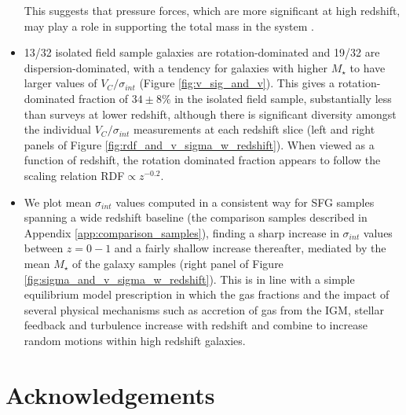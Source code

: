 \documentclass[fleqn,usenatbib]{mnras}
\begin{document}
\begin{itemize}
    This suggests that pressure forces, which are more significant at high redshift, may play a role in supporting the total mass in the system \citep[e.g.][]{Burkert2010}.  
    \item 13/32 isolated field sample galaxies are rotation-dominated and 19/32 are dispersion-dominated, with a tendency for galaxies with higher $M_{\star}$ to have larger values of $V_{C}/\sigma_{int}$ (Figure \ref{fig:v_sig_and_v}).
    This gives a rotation-dominated fraction of $34 \pm 8 \%$ in the isolated field sample, substantially less than surveys at lower redshift, although there is significant diversity amongst the individual $V_{C}/\sigma_{int}$ measurements at each redshift slice (left and right panels of Figure \ref{fig:rdf_and_v_sigma_w_redshift}).
    When viewed as a function of redshift, the rotation dominated fraction appears to follow the scaling relation RDF$\propto z^{-0.2}$.
    \item We plot mean $\sigma_{int}$ values computed in a consistent way for SFG samples spanning a wide redshift baseline (the comparison samples described in Appendix \ref{app:comparison_samples}), finding a sharp increase in $\sigma_{int}$ values between $z=0-1$ and a fairly shallow increase thereafter, mediated by the mean $M_{\star}$ of the galaxy samples (right panel of Figure \ref{fig:sigma_and_v_sigma_w_redshift}).
    This is in line with a simple equilibrium model prescription in which the gas fractions and the impact of several physical mechanisms such as accretion of gas from the IGM, stellar feedback and turbulence increase with redshift and combine to increase random motions within high redshift galaxies.


\end{itemize}

\section*{Acknowledgements}
\end{document}
